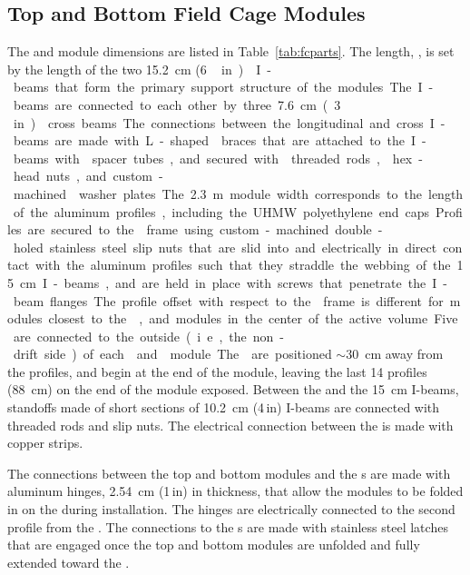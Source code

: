 \subsection{Top and Bottom Field Cage Modules}

The  and  module dimensions are listed in Table~\ref{tab:fcparts}. The length, \spfcmodlen{}, is set by the length of the two \SI{15.2}{\cm} (\SI{6}\,in)  I-beams that form the primary support structure of the modules. The I-beams are connected to each other by three  \SI{7.6}{\cm} (\SI{3}\,in)  cross beams. The connections between the longitudinal and cross I-beams are made with L-shaped  braces that are attached to the I-beams with  spacer tubes, and secured with  threaded rods,  hex-head nuts, and custom-machined \frfour washer plates.

The \SI{2.3}{\m} module width corresponds to the length of the aluminum profiles, including the UHMW polyethylene end caps. Profiles are secured to the  frame using custom-machined double-holed stainless steel slip nuts that are slid into and electrically in direct contact with the aluminum profiles such that they straddle the webbing of the \SI{15}{\cm} I-beams, and are held in place with screws that penetrate the I-beam flanges. The profile offset with respect to the  frame is different for modules closest to the , %
and modules in the center of the active volume.

Five  are connected to the outside (i.e., the non-drift side) of each  and  module. The  are positioned $\sim$\SI{30}{\cm} away from the profiles, and begin at the  end of the module, leaving the last 14 profiles (\SI{88}{\cm}) on the  end of the module exposed. Between the  and the \SI{15}{\cm} I-beams, standoffs made of short sections of \SI{10.2}{\cm} (4\,in)   I-beams are connected with  threaded rods and slip nuts. The electrical connection between the  is made with copper strips.

The connections between the top and bottom modules and the s are made with aluminum hinges, \SI{2.54}{\cm} (1\,in) in thickness, that allow the modules to be folded in on the  during installation. The hinges are electrically connected to the second profile from the . The connections to the s are made with stainless steel latches that are engaged once the top and bottom  modules are unfolded and fully extended toward the .

